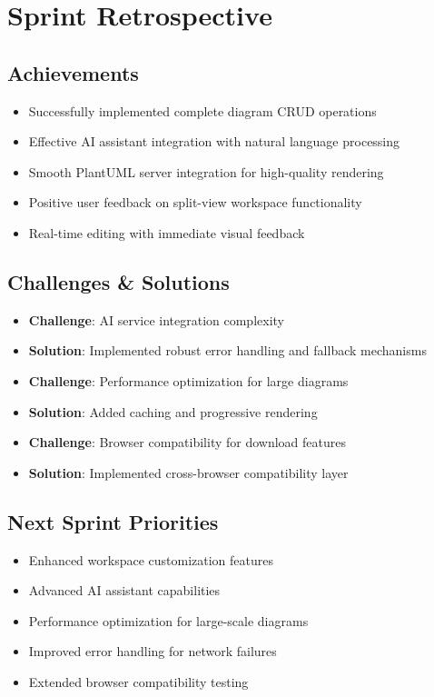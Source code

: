 \section{Sprint Retrospective}

\subsection{Achievements}
\begin{itemize}
    \item Successfully implemented complete diagram CRUD operations
    \item Effective AI assistant integration with natural language processing
    \item Smooth PlantUML server integration for high-quality rendering
    \item Positive user feedback on split-view workspace functionality
    \item Real-time editing with immediate visual feedback
\end{itemize}

\subsection{Challenges \& Solutions}
\begin{itemize}
    \item \textbf{Challenge}: AI service integration complexity
    \item \textbf{Solution}: Implemented robust error handling and fallback mechanisms
    \item \textbf{Challenge}: Performance optimization for large diagrams
    \item \textbf{Solution}: Added caching and progressive rendering
    \item \textbf{Challenge}: Browser compatibility for download features
    \item \textbf{Solution}: Implemented cross-browser compatibility layer
\end{itemize}

\subsection{Next Sprint Priorities}
\begin{itemize}
    \item Enhanced workspace customization features
    \item Advanced AI assistant capabilities
    \item Performance optimization for large-scale diagrams
    \item Improved error handling for network failures
    \item Extended browser compatibility testing
\end{itemize}

